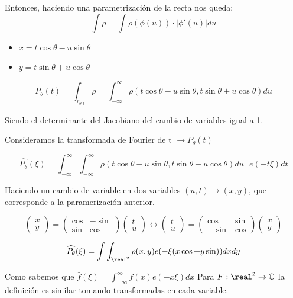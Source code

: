 \begin{itemize}
	Entonces, haciendo una parametrización de la recta nos queda:
	$$\int \rho = \int \rho (\phi(u)) \cdot |\phi '(u)| du$$
	\begin{itemize}
		\item $x = t\cos\theta - u \sin\theta$
		\item $y = t\sin\theta + u \cos\theta$
	\end{itemize}

	$$P_{\theta} (t) = \int_{r_{\theta , t}} \rho = \int_{-\infty}^{\infty} \rho ( t\cos\theta - u\sin\theta , t\sin\theta + u\cos\theta) du$$

	Siendo el determinante del Jacobiano del cambio de variables igual a 1.

	Consideramos la transformada de Fourier de t $\rightarrow P_{\theta}(t)$

	$$\widehat{P_{\theta}}(\xi) = \int_{-\infty}^{\infty} \int_{-\infty}^{\infty} \rho ( t\cos\theta - u\sin\theta , t\sin\theta + u\cos\theta) du\text{  }e(-t\xi) dt $$

	Haciendo un cambio de variable en dos variables $(u,t) \rightarrow (x,y)$, que corresponde a la paramerización anterior.

	$$\left(\begin{matrix}
		x\\
		y
	\end{matrix} \right) = \left( \begin{matrix}
	\cos & -\sin\\
	\sin & \cos
	\end{matrix}\right)\left(\begin{matrix}
	t\\
	u
	\end{matrix}\right) \longleftrightarrow \left(\begin{matrix}
	t\\
	u
	\end{matrix} \right) = \left( \begin{matrix}
	\cos & \sin\\
	-\sin & \cos
	\end{matrix}\right)\left(\begin{matrix}
	x\\
	y
	\end{matrix}\right)$$

	$$\widehat{P_{\theta}}(\xi) = \int\int_{\real^2} \rho(x,y) e(-\xi(x\cos + y\sin)) dxdy$$

	\obs Como sabemos que $\widehat{f}(\xi) = \int_{-\infty}^{\infty} f(x) e(-x\xi)dx$ Para $F : \real^2 \rightarrow \mathbb{C}$ la definición es similar tomando transformadas en cada variable.


\end{itemize}
